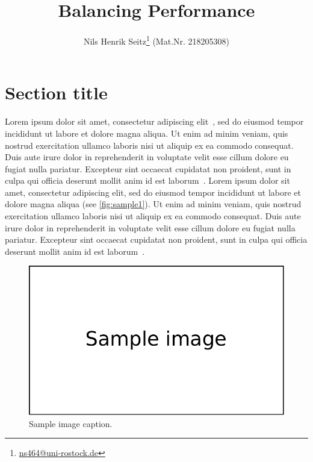 \documentclass[final,nopreprintline]{elsarticle}
\begin{document}
\begin{frontmatter}

\title{Balancing Performance }
\author{Nils Henrik Seitz\footnote[1]{\href{mailto:ns464@uni-rostock.de}{ns464@uni-rostock.de}} (Mat.Nr. 218205308)}
\address{Institute for Visual \& Analytic Computing\\University of Rostock}

\begin{abstract}
    
\end{abstract}

\end{frontmatter}

\section{Section title}
\label{sec:sample1}

Lorem ipsum dolor sit amet, consectetur adipiscing elit~\cite{Tominski12GreatWall}, sed do eiusmod tempor incididunt ut labore et dolore magna aliqua. Ut enim ad minim veniam, quis nostrud exercitation ullamco laboris nisi ut aliquip ex ea commodo consequat. Duis aute irure dolor in reprehenderit in voluptate velit esse cillum dolore eu fugiat nulla pariatur. Excepteur sint occaecat cupidatat non proident, sunt in culpa qui officia deserunt mollit anim id est laborum~\cite{Tominski16CompaRing,Tominski17LensesExtended}.
Lorem ipsum dolor sit amet, consectetur adipiscing elit, sed do eiusmod tempor incididunt ut labore et dolore magna aliqua (see \autoref{fig:sample1}). Ut enim ad minim veniam, quis nostrud exercitation ullamco laboris nisi ut aliquip ex ea commodo consequat. Duis aute irure dolor in reprehenderit in voluptate velit esse cillum dolore eu fugiat nulla pariatur. Excepteur sint occaecat cupidatat non proident, sunt in culpa qui officia deserunt mollit anim id est laborum~\cite{Tominski20IVDA}.

\begin{figure}
\centering
\includegraphics{img/sample_image}
\caption{Sample image caption.}
\label{fig:sample1}
\end{figure}
\end{document}
